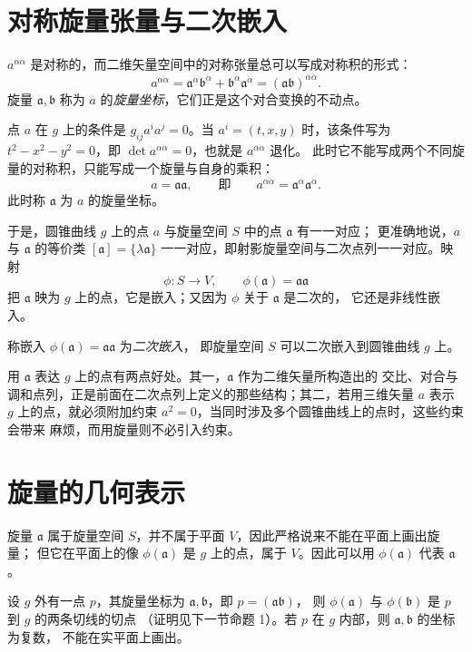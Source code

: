 \section{对称旋量张量与二次嵌入}

$a^{\alpha\dot\alpha}$ 是对称的，而二维矢量空间中的对称张量总可以写成对称积的形式：
\[
a^{\alpha\dot\alpha}=\mathfrak a^\alpha\mathfrak b^{\dot\alpha}
+\mathfrak b^\alpha\mathfrak a^{\dot\alpha}=(\mathfrak a\mathfrak b)^{\alpha\dot\alpha}.
\]
旋量 $\mathfrak a,\mathfrak b$ 称为 $a$ 的\emph{旋量坐标}，它们正是这个对合变换的不动点。

点 $a$ 在 $g$ 上的条件是 $g_{ij}a^ia^j=0$。当 $a^i=(t,x,y)$ 时，该条件写为
$t^2-x^2-y^2=0$，即 $\det a^{\alpha\dot\alpha}=0$，也就是 $a^{\alpha\dot\alpha}$ 退化。
此时它不能写成两个不同旋量的对称积，只能写成一个旋量与自身的乘积：
\[
a=\mathfrak a\mathfrak a,\qquad\text{即}\qquad
a^{\alpha\dot\alpha}=\mathfrak a^\alpha\mathfrak a^{\dot\alpha}.
\]
此时称 $\mathfrak a$ 为 $a$ 的旋量坐标。

于是，圆锥曲线 $g$ 上的点 $a$ 与旋量空间 $S$ 中的点 $\mathfrak a$ 有一一对应；
更准确地说，$a$ 与 $\mathfrak a$ 的等价类 $[\mathfrak a]=\{\lambda\mathfrak a\}$
一一对应，即射影旋量空间与二次点列一一对应。映射
\[
\phi:S\to V,\qquad \phi(\mathfrak a)=\mathfrak a\mathfrak a
\]
把 $\mathfrak a$ 映为 $g$ 上的点，它是嵌入；又因为 $\phi$ 关于 $\mathfrak a$ 是二次的，
它还是非线性嵌入。

\begin{definition}[二次嵌入]
称嵌入 $\phi(\mathfrak a)=\mathfrak a\mathfrak a$ 为\emph{二次嵌入}，
即旋量空间 $S$ 可以二次嵌入到圆锥曲线 $g$ 上。
\end{definition}

用 $\mathfrak a$ 表达 $g$ 上的点有两点好处。其一，$\mathfrak a$ 作为二维矢量所构造出的
交比、对合与调和点列，正是前面在二次点列上定义的那些结构；其二，若用三维矢量 $a$ 表示
$g$ 上的点，就必须附加约束 $a^2=0$，当同时涉及多个圆锥曲线上的点时，这些约束会带来
麻烦，而用旋量则不必引入约束。

\section{旋量的几何表示}

旋量 $\mathfrak a$ 属于旋量空间 $S$，并不属于平面 $V$，因此严格说来不能在平面上画出旋量；
但它在平面上的像 $\phi(\mathfrak a)$ 是 $g$ 上的点，属于 $V$。因此可以用 $\phi(\mathfrak a)$
代表 $\mathfrak a$。

设 $g$ 外有一点 $p$，其旋量坐标为 $\mathfrak a,\mathfrak b$，即 $p=(\mathfrak a\mathfrak b)$，
则 $\phi(\mathfrak a)$ 与 $\phi(\mathfrak b)$ 是 $p$ 到 $g$ 的两条切线的切点
（证明见下一节命题 1）。若 $p$ 在 $g$ 内部，则 $\mathfrak a,\mathfrak b$ 的坐标为复数，
不能在实平面上画出。

